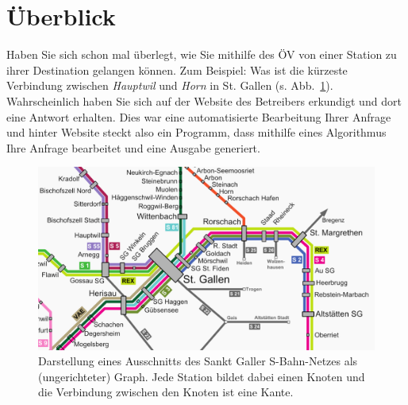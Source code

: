 \section*{Überblick}


Haben Sie sich schon mal überlegt, wie Sie mithilfe des ÖV von einer Station zu ihrer Destination gelangen können. 
Zum Beispiel: Was ist die kürzeste Verbindung zwischen \emph{Hauptwil} und \emph{Horn} in St. Gallen (s. Abb.~\ref{fig:sbahn2}). 
Wahrscheinlich haben Sie sich auf der Website des Betreibers erkundigt und dort eine Antwort erhalten. 
Dies war eine automatisierte Bearbeitung Ihrer Anfrage und hinter Website steckt also ein Programm, dass mithilfe eines Algorithmus Ihre Anfrage bearbeitet und eine Ausgabe generiert.



\begin{figure}[htb]
\begin{center}

\includegraphics[width=.67\textwidth]{../fig/sbahn_netz_ausschnitt.png}
\caption{Darstellung eines Ausschnitts des Sankt Galler S-Bahn-Netzes als (ungerichteter) Graph.
Jede Station bildet dabei einen Knoten und die Verbindung zwischen den Knoten ist eine Kante.
}

\label{fig:sbahn2}
\end{center}
\end{figure}

